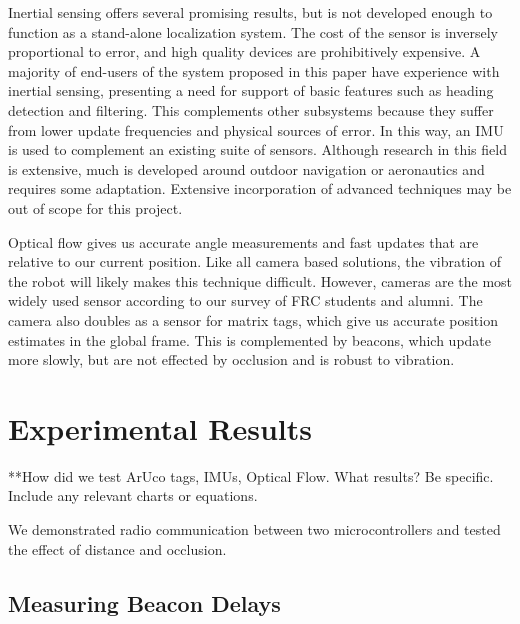 \documentclass{article}
\begin{document}
Inertial sensing offers several promising results, but is not developed enough to function as a stand-alone localization system. The cost of the sensor is inversely proportional to error, and high quality devices are prohibitively expensive. A majority of end-users of the system proposed in this paper have experience with inertial sensing, presenting a need for support of basic features such as heading detection and filtering. This complements other subsystems because they suffer from lower update frequencies and physical sources of error. In this way, an IMU is used to complement an existing suite of sensors. Although research in this field is extensive, much is developed around outdoor navigation or aeronautics and requires some adaptation. Extensive incorporation of advanced techniques may be out of scope for this project.

Optical flow gives us accurate angle measurements and fast updates that are relative to our current position. Like all camera based solutions, the vibration of the robot will likely makes this technique difficult. However, cameras are the most widely used sensor according to our survey of FRC students and alumni.
The camera also doubles as a sensor for matrix tags, which give us accurate position estimates in the global frame. This is complemented by beacons, which update more slowly, but are not effected by occlusion and is robust to vibration.

\section{Experimental Results} \label{experiments}

**How did we test ArUco tags, IMUs, Optical Flow. What results? Be specific. Include any relevant charts or equations.

We demonstrated radio communication between two microcontrollers and tested the effect of distance and occlusion.

\subsection{Measuring Beacon Delays}
\end{document}
